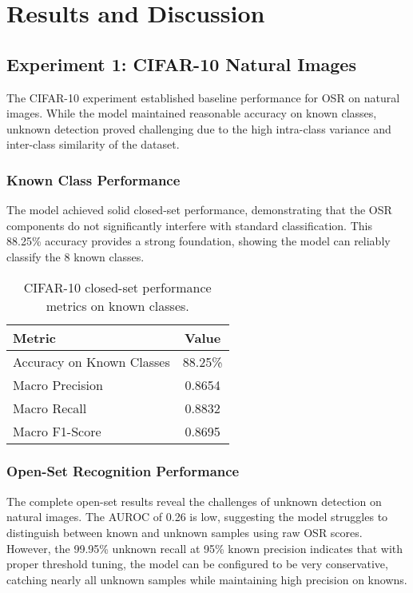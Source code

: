 \documentclass[11pt, a4paper]{article}
\begin{document}
\section{Results and Discussion}

\subsection{Experiment 1: CIFAR-10 Natural Images}

The CIFAR-10 experiment established baseline performance for OSR on natural images. While the model maintained reasonable accuracy on known classes, unknown detection proved challenging due to the high intra-class variance and inter-class similarity of the dataset.

\subsubsection{Known Class Performance}
The model achieved solid closed-set performance, demonstrating that the OSR components do not significantly interfere with standard classification. This 88.25\% accuracy provides a strong foundation, showing the model can reliably classify the 8 known classes.

\begin{table}[H]
\centering
\begin{tabular}{lc}
\toprule
\textbf{Metric} & \textbf{Value} \\
\midrule
Accuracy on Known Classes & 88.25\% \\
Macro Precision & 0.8654 \\
Macro Recall & 0.8832 \\
Macro F1-Score & 0.8695 \\
\bottomrule
\end{tabular}
\caption{CIFAR-10 closed-set performance metrics on known classes.}
\label{tab:cifar10_closed_set_metrics}
\end{table}

\subsubsection{Open-Set Recognition Performance}
The complete open-set results reveal the challenges of unknown detection on natural images. The AUROC of 0.26 is low, suggesting the model struggles to distinguish between known and unknown samples using raw OSR scores. However, the 99.95\% unknown recall at 95\% known precision indicates that with proper threshold tuning, the model can be configured to be very conservative, catching nearly all unknown samples while maintaining high precision on knowns.
\end{document}
